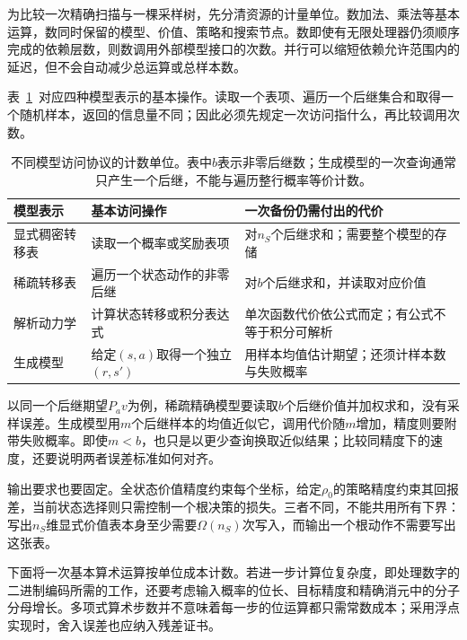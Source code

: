 为比较一次精确扫描与一棵采样树，先分清资源的计量单位。数加法、乘法等基本运算，数同时保留的模型、价值、策略和搜索节点。数即使有无限处理器仍须顺序完成的依赖层数，则数调用外部模型接口的次数。并行可以缩短依赖允许范围内的延迟，但不会自动减少总运算或总样本数。

表~\ref{tab:rl-planning-access-models}~对应四种模型表示的基本操作。读取一个表项、遍历一个后继集合和取得一个随机样本，返回的信息量不同；因此必须先规定一次访问指什么，再比较调用次数。

\begin{table}[htbp]
 \centering
 \small
 \begin{tabularx}{\linewidth}{@{}l>{\raggedright\arraybackslash}X>{\raggedright\arraybackslash}X@{}}
  \toprule
  模型表示 & 基本访问操作 & 一次备份仍需付出的代价\\
  \midrule
  显式稠密转移表 & 读取一个概率或奖励表项 & 对$n_S$个后继求和；需要整个模型的存储\\
  稀疏转移表 & 遍历一个状态动作的非零后继 & 对$b$个后继求和，并读取对应价值\\
  解析动力学 & 计算状态转移或积分表达式 & 单次函数代价依公式而定；有公式不等于积分可解析\\
  生成模型 & 给定$(s,a)$取得一个独立$(r,s')$ & 用样本均值估计期望；还须计样本数与失败概率\\
  \bottomrule
 \end{tabularx}
 \caption{不同模型访问协议的计数单位。表中$b$表示非零后继数；生成模型的一次查询通常只产生一个后继，不能与遍历整行概率等价计数。}
 \label{tab:rl-planning-access-models}
\end{table}

以同一个后继期望$P_av$为例，稀疏精确模型要读取$b$个后继价值并加权求和，没有采样误差。生成模型用$m$个后继样本的均值近似它，调用代价随$m$增加，精度则要附带失败概率。即使$m<b$，也只是以更少查询换取近似结果；比较同精度下的速度，还要说明两者误差标准如何对齐。

输出要求也要固定。全状态价值精度约束每个坐标，给定$\rho_0$的策略精度约束其回报差，当前状态选择则只需控制一个根决策的损失。三者不同，不能共用所有下界：写出$n_S$维显式价值表本身至少需要$\Omega(n_S)$次写入，而输出一个根动作不需要写出这张表。

下面将一次基本算术运算按单位成本计数。若进一步计算位复杂度，即处理数字的二进制编码所需的工作，还要考虑输入概率的位长、目标精度和精确消元中的分子分母增长。多项式算术步数并不意味着每一步的位运算都只需常数成本；采用浮点实现时，舍入误差也应纳入残差证书。

